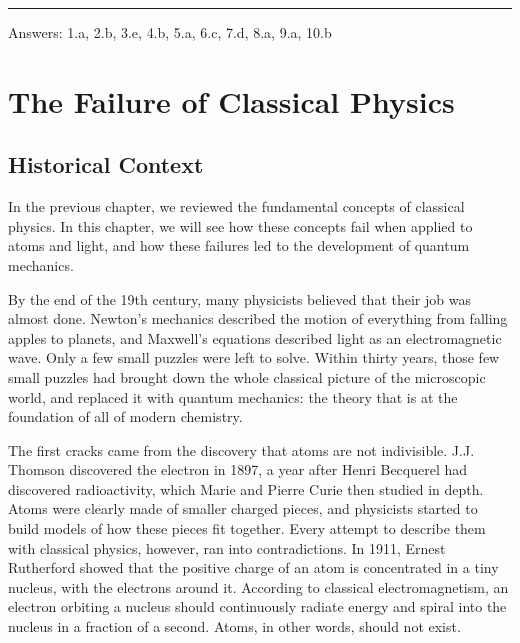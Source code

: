 \documentclass[
  english,
  9pt,
]{extbook}
\theoremstyle{definition}
\theoremstyle{definition}
\theoremstyle{definition}
\theoremstyle{definition}
\theoremstyle{remark}
\begin{document}
\begin{center}\rule{0.5\linewidth}{0.5pt}\end{center}

Answers: 1.a, 2.b, 3.e, 4.b, 5.a, 6.c, 7.d, 8.a, 9.a, 10.b

\chapter{The Failure of Classical Physics}\label{Motivation}

\section{Historical Context}\label{historical-context}

In the previous chapter, we reviewed the fundamental concepts of classical physics. In this chapter, we will see how these concepts fail when applied to atoms and light, and how these failures led to the development of quantum mechanics.

By the end of the 19th century, many physicists believed that their job was almost done. Newton's mechanics described the motion of everything from falling apples to planets, and Maxwell's equations described light as an electromagnetic wave. Only a few small puzzles were left to solve. Within thirty years, those few small puzzles had brought down the whole classical picture of the microscopic world, and replaced it with quantum mechanics: the theory that is at the foundation of all of modern chemistry.

The first cracks came from the discovery that atoms are not indivisible. J.J. Thomson discovered the electron in 1897, a year after Henri Becquerel had discovered radioactivity, which Marie and Pierre Curie then studied in depth. Atoms were clearly made of smaller charged pieces, and physicists started to build models of how these pieces fit together. Every attempt to describe them with classical physics, however, ran into contradictions. In 1911, Ernest Rutherford showed that the positive charge of an atom is concentrated in a tiny nucleus, with the electrons around it. According to classical electromagnetism, an electron orbiting a nucleus should continuously radiate energy and spiral into the nucleus in a fraction of a second. Atoms, in other words, should not exist.
\end{document}
